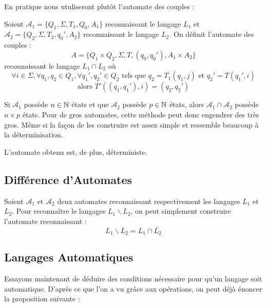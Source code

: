 En pratique nous utuliseront plutôt l'automate des couples : 

\begin{definition}
    Soient $ \mathcal{A}_1 = \{Q_1, \Sigma, T_1, Q_0, A_1\}$ reconnaissant le langage $L_1$ et 
    $ \mathcal{A}_2 = \{Q_2, \Sigma, T_2, q_0', A_2\}$ reconnaissant le langage $L_2$. On définit 
    l'automate des couples : 
        \[ A = \{Q_1 \times Q_2, \Sigma, T, (q_0,q_0'), A_1 \times A_2\} \] 
    reconnaissant le langage $L_1 \cap L_2$ où 
        \[ \forall i \in \Sigma, \forall q_1, q_2 \in Q_1, \forall q_1', q_2' \in Q_2 \text{ tels que } q_2 = T_1(q_1,j) \text{ et } q_2' = T(q_1',i) \]
        \[ \text{alors } T'((q_1, q_1'), i) = (q_2, q_2') \] 
\end{definition}

\begin{proposition}
    Si $ \mathcal{A}_1$ possède $n \in \mathbb{N}$ états et que $ \mathcal{A}_2$ possède $p \in \mathbb{N}$ états, alors 
    $ \mathcal{A}_1 \cap \mathcal{A}_2$ possède $n \times p$ états. 
    Pour de gros automates, cette méthode peut donc engendrer des très gros. 
    Même si la façon de les construire est assez simple et ressemble beaucoup à la déterminisation. 

    L'automate obtenu est, de plus, déterministe. 
\end{proposition}


\subsection{Différence d'Automates}

\begin{proposition}
    Soient $ \mathcal{A}_1$ et  $ \mathcal{A}_2$ deux automates reconnaissant respectivement les langages $L_1$ et $L_2$. 
    Pour reconnaître le langages $L_1 \backslash L_2$, on peut simplement construire l'automate reconnaissant :
        \[ L_1 \backslash L_2 = L_1 \cap \overline{L_2} \] 
\end{proposition}

\subsection{Langages Automatiques}

Essayons maintenant de déduire des conditions nécessaire pour qu'un langage soit automatique. 
D'après ce que l'on a vu grâce aux opérations, on peut déjà énoncer la proposition suivante : 

